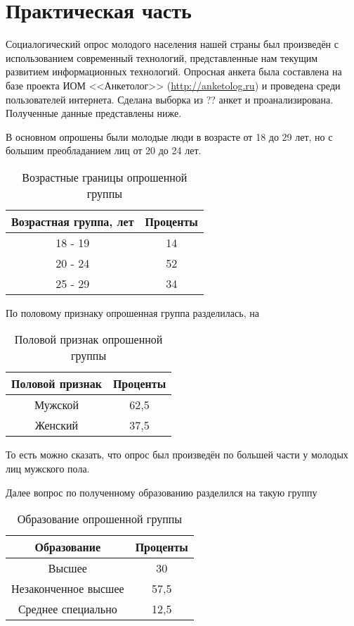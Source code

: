 \section{Практическая часть}

Социалогический опрос молодого населения нашей страны был произведён с 
использованием современный технологий, представленные нам текущим развитием 
информационных технологий. Опросная анкета была составлена на базе проекта 
ИОМ <<Анкетолог>> (\url{http://anketolog.ru}) и проведена среди пользователей 
интернета. Сделана выборка из ?? анкет и проанализирована. Полученные данные 
представлены ниже.

В основном опрошены были молодые люди в возрасте от 18 до 29 лет, но с большим 
преобладанием лиц от 20 до 24 лет.

\begin{table}[h!]
    \centering
    \begin{tabular}{|c|c|}
        \hline
        Возрастная группа, лет & Проценты \\ \hline \hline
        18 - 19 & 14 \\ \hline
        20 - 24 & 52 \\ \hline
        25 - 29 & 34 \\ \hline
    \end{tabular}
    \caption{Возрастные границы опрошенной группы}
    \label{table:01}
\end{table}

По половому признаку опрошенная группа разделилась, на 
\begin{table}[h!]
    \centering
    \begin{tabular}{|c|c|}
        \hline
        Половой признак & Проценты \\ \hline \hline
        Мужской & 62,5 \\ \hline
        Женский & 37,5 \\ \hline
    \end{tabular}
    \caption{Половой признак опрошенной группы}
\end{table}

То есть можно сказать, что опрос был произведён по большей части у молодых 
лиц мужского пола.

Далее вопрос по полученному образованию разделился на такую группу
\begin{table}[h!]
    \centering
    \begin{tabular}{|c|c|}
        \hline
        Образование & Проценты \\ \hline \hline
        Высшее & 30 \\ \hline
        Незаконченное высшее & 57,5 \\ \hline
        Среднее специально & 12,5 \\ \hline
    \end{tabular}
    \caption{Образование опрошенной группы}
\end{table}

